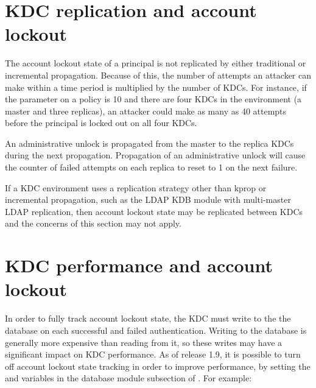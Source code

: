 \documentclass[letterpaper,10pt,english]{sphinxmanual}
\begin{document}
\section{KDC replication and account lockout}
\label{\detokenize{admin/lockout:kdc-replication-and-account-lockout}}
The account lockout state of a principal is not replicated by either
traditional {\hyperref[\detokenize{admin/admin_commands/kprop:kprop-8}]{}} or incremental propagation.  Because of
this, the number of attempts an attacker can make within a time period
is multiplied by the number of KDCs.  For instance, if the
 parameter on a policy is 10 and there are four KDCs in
the environment (a master and three replicas), an attacker could make
as many as 40 attempts before the principal is locked out on all four
KDCs.

An administrative unlock is propagated from the master to the replica
KDCs during the next propagation.  Propagation of an administrative
unlock will cause the counter of failed attempts on each replica to
reset to 1 on the next failure.

If a KDC environment uses a replication strategy other than kprop or
incremental propagation, such as the LDAP KDB module with multi-master
LDAP replication, then account lockout state may be replicated between
KDCs and the concerns of this section may not apply.


\section{KDC performance and account lockout}
\label{\detokenize{admin/lockout:kdc-performance-and-account-lockout}}\label{\detokenize{admin/lockout:disable-lockout}}
In order to fully track account lockout state, the KDC must write to
the the database on each successful and failed authentication.
Writing to the database is generally more expensive than reading from
it, so these writes may have a significant impact on KDC performance.
As of release 1.9, it is possible to turn off account lockout state
tracking in order to improve performance, by setting the
 and  variables in the
database module subsection of {\hyperref[\detokenize{admin/conf_files/kdc_conf:kdc-conf-5}]{}}.  For example:

%
\begin{sphinxVerbatim}[commandchars=\\\{\}]
\PYG{p}{[}\PYG{p}{]}
      
          
          
\end{sphinxVerbatim}
\end{document}
